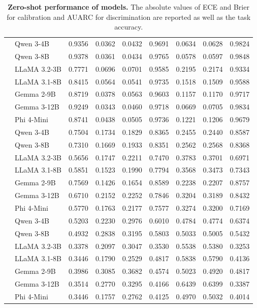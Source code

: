 \begin{table}[b]
{\begin{tabular}{c|l|c|c c c|c c c}
  & Qwen 3-4B & 0.9356 & 0.0362 & 0.0432 & 0.9691 & 0.0634 & 0.0628 & 0.9824 \\
  & Qwen 3-8B & 0.9378 & 0.0361 & 0.0434 & 0.9765 & 0.0578 & 0.0597 & 0.9848 \\
  & LLaMA 3.2-3B & 0.7771 & 0.0696 & 0.0701 & 0.9585 & 0.2195 & 0.2174 & 0.9334 \\
  & LLaMA 3.1-8B & 0.8415 & 0.0564 & 0.0541 & 0.9735 & 0.1518 & 0.1509 & 0.9588 \\
  & Gemma 2-9B & 0.8719 & 0.0378 & 0.0563 & 0.9603 & 0.1157 & 0.1170 & 0.9717 \\
  & Gemma 3-12B & 0.9249 & 0.0343 & 0.0460 & 0.9718 & 0.0669 & 0.0705 & 0.9834 \\
  & Phi 4-Mini & 0.8741 & 0.0438 & 0.0505 & 0.9736 & 0.1221 & 0.1206 & 0.9679 \\
  \midrule

  & Qwen 3-4B & 0.7504 & 0.1734 & 0.1829 & 0.8365 & 0.2455 & 0.2440 & 0.8587 \\
  & Qwen 3-8B & 0.7310 & 0.1669 & 0.1933 & 0.8351 & 0.2562 & 0.2568 & 0.8368 \\
  & LLaMA 3.2-3B & 0.5656 & 0.1747 & 0.2211 & 0.7470 & 0.3783 & 0.3701 & 0.6971 \\
  & LLaMA 3.1-8B & 0.5851 & 0.1523 & 0.1990 & 0.7794 & 0.3568 & 0.3473 & 0.7343 \\
  & Gemma 2-9B & 0.7569 & 0.1426 & 0.1654 & 0.8589 & 0.2238 & 0.2207 & 0.8757 \\
  & Gemma 3-12B & 0.6710 & 0.2152 & 0.2252 & 0.7846 & 0.3204 & 0.3189 & 0.8432 \\
  & Phi 4-Mini & 0.5770 & 0.1763 & 0.2177 & 0.7577 & 0.3274 & 0.3200 & 0.7169 \\
  \midrule

  & Qwen 3-4B & 0.5203 & 0.2230 & 0.2976 & 0.6010 & 0.4784 & 0.4774 & 0.6374 \\
  & Qwen 3-8B & 0.4932 & 0.2838 & 0.3195 & 0.5803 & 0.5033 & 0.5005 & 0.5432 \\
  & LLaMA 3.2-3B & 0.3378 & 0.2097 & 0.3047 & 0.3530 & 0.5538 & 0.5380 & 0.3253 \\
  & LLaMA 3.1-8B & 0.3446 & 0.1790 & 0.2529 & 0.4817 & 0.5838 & 0.5790 & 0.4136 \\
  & Gemma 2-9B & 0.3986 & 0.3085 & 0.3682 & 0.4574 & 0.5023 & 0.4920 & 0.4817 \\
  & Gemma 3-12B & 0.3514 & 0.2770 & 0.3295 & 0.4166 & 0.6439 & 0.6399 & 0.3387 \\
  & Phi 4-Mini & 0.3446 & 0.1757 & 0.2762 & 0.4125 & 0.4970 & 0.5032 & 0.4014 \\

\bottomrule
\end{tabular}
}
\caption{\textbf{Zero-shot performance of models.} The absolute values of ECE and Brier for calibration and AUARC for discrimination are reported as well as the task accuracy.}
\label{tab:zeroshot-permodel}
\end{table}